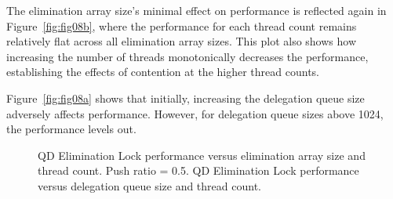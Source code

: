 The elimination array size's minimal effect on performance is reflected again in Figure~\ref{fig:fig08b}, where the performance for each thread count remains relatively flat across all elimination array sizes. This plot also shows how increasing the number of threads monotonically decreases the performance, establishing the effects of contention at the higher thread counts.

Figure~\ref{fig:fig08a} shows that initially, increasing the delegation queue size adversely affects performance. However, for delegation queue sizes above 1024, the performance levels out.

\begin{figure}[]
\centering
{}
\caption[]{ QD Elimination Lock performance versus elimination array size and thread count. Push ratio = 0.5.  QD Elimination Lock performance versus delegation queue size and thread count.}
\label{fig:qdsize_and_thrd}
\end{figure}
